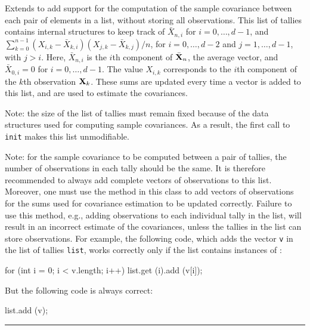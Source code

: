 
Extends  to add support for the computation
of the sample covariance between each pair of elements
in a list, without storing all observations.
This list of tallies contains internal structures to keep track of
$\bar X_{n, i}$ for $i=0, \ldots, d-1$, and
$\sum_{k=0}^{n-1} (X_{i, k} - \bar X_{k, i})(X_{j, k} - \bar X_{k, j})/n$, for
$i=0,\ldots, d-2$ and $j=1,\ldots,d-1$, with $j>i$.
Here, $\bar X_{n, i}$ is the $i$th component of $\bar{\mathbf{X}}_n$, the average vector,
and $\bar X_{0, i}=0$ for $i=0,\ldots,d-1$.
The value $X_{i,k}$ corresponds to the $i$th component of the $k$th observation
$\mathbf{X}_k$.
These sums are updated every time a vector is added to this list, and
are used to estimate the covariances.

Note: the size of the list of tallies must remain fixed because of the
data structures used for computing sample covariances.
As a result, the first call to \texttt{init} makes this list
unmodifiable.

Note: for the sample covariance to be computed between a pair
of tallies, the number of observations in each tally
should be the same.  It is therefore recommended to always
add complete vectors of observations to this list.
Moreover, one must use
the  method in this class to add vectors of observations for
the sums used for covariance estimation to be updated correctly.
Failure to use this method, e.g., adding observations
to each individual tally in the list, will result in an incorrect
estimate of the covariances, unless the tallies
in the list can store observations.
For example, the following code, which adds the vector \texttt{v} in
the list of tallies \texttt{list}, works correctly only if the list
contains instances of :
\begin{vcode}
   for (int i = 0; i < v.length; i++)
      list.get (i).add (v[i]);
\end{vcode}
But the following code is always correct:
\begin{vcode}
   list.add (v);
\end{vcode}

\bigskip\hrule

